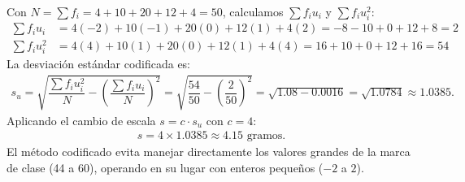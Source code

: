 \begin{solproblema}[prob:78de91c]
	Con $N=\sum f_i = 4+10+20+12+4=50$, calculamos $\sum f_iu_i$ y $\sum f_iu_i^2$:
	\begin{align}
		\sum f_iu_i &= 4(-2)+10(-1)+20(0)+12(1)+4(2) = -8-10+0+12+8 = 2 \\
		\sum f_iu_i^2 &= 4(4)+10(1)+20(0)+12(1)+4(4) = 16+10+0+12+16 = 54
	\end{align}
	La desviación estándar codificada es:
	\begin{align}
		s_u = \sqrt{\dfrac{\sum f_iu_i^2}{N} - \left(\dfrac{\sum f_iu_i}{N}\right)^2} = \sqrt{\dfrac{54}{50} - \left(\dfrac{2}{50}\right)^2} = \sqrt{1.08 - 0.0016} = \sqrt{1.0784} \approx 1.0385.
	\end{align}
	Aplicando el cambio de escala $s = c \cdot s_u$ con $c=4$:
	\begin{align}
		s = 4 \times 1.0385 \approx 4.15 \text{ gramos.}
	\end{align}
	El método codificado evita manejar directamente los valores grandes de la marca de clase (44 a 60), operando en su lugar con enteros pequeños ($-2$ a $2$).
\end{solproblema}
